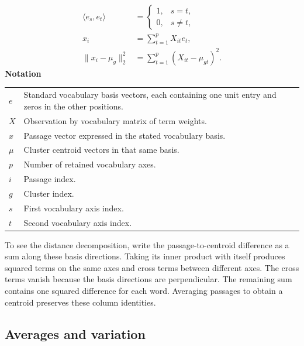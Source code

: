 \documentclass[10pt,letterpaper]{article}
\newcommand{\notlabel}{\noindent\textbf{Notation}\par\nobreak\vspace{4pt}}
\begin{document}
\par\noindent\begin{minipage}{\linewidth}
\begin{equation}\label{eq:vocabularybasis}
\begin{aligned}\langle e_s,e_t\rangle&=\begin{cases}1,&s=t,\\0,&s\ne t,\end{cases}\\x_i&=\sum_{t=1}^{p}X_{it}e_t,\\\lVert x_i-\mu_g\rVert_2^2&=\sum_{t=1}^{p}(X_{it}-\mu_{gt})^2.\end{aligned}
\end{equation}
\notlabel
{\fontsize{8.5}{10.5}\selectfont\setlength{\tabcolsep}{0pt}\renewcommand{\arraystretch}{1.12}
\begin{tabularx}{\linewidth}{@{}p{.14\linewidth}X@{}}
$e$ & Standard vocabulary basis vectors, each containing one unit entry and zeros in the other positions.\\
$X$ & Observation by vocabulary matrix of term weights.\\
$x$ & Passage vector expressed in the stated vocabulary basis.\\
$\mu$ & Cluster centroid vectors in that same basis.\\
$p$ & Number of retained vocabulary axes.\\
$i$ & Passage index.\\
$g$ & Cluster index.\\
$s$ & First vocabulary axis index.\\
$t$ & Second vocabulary axis index.\\
\end{tabularx}}
\par\vspace{2pt}
\end{minipage}\par
To see the distance decomposition, write the passage-to-centroid difference as a sum along these basis directions. Taking its inner product with itself produces squared terms on the same axes and cross terms between different axes. The cross terms vanish because the basis directions are perpendicular. The remaining sum contains one squared difference for each word. Averaging passages to obtain a centroid preserves these column identities.\par

\subsection{Averages and variation}
\end{document}

